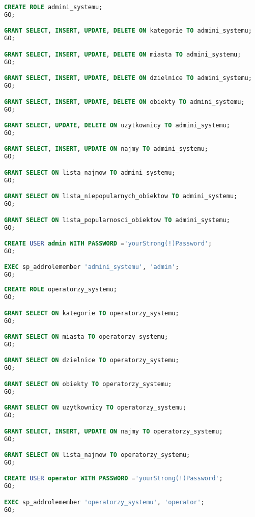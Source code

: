 \begin{lstlisting}[language=SQL, caption={Skrypt tworzący rolę i użytkownika administracyjnego}, label={lst:role-admin}]
CREATE ROLE admini_systemu;
GO;

GRANT SELECT, INSERT, UPDATE, DELETE ON kategorie TO admini_systemu;
GO;

GRANT SELECT, INSERT, UPDATE, DELETE ON miasta TO admini_systemu;
GO;

GRANT SELECT, INSERT, UPDATE, DELETE ON dzielnice TO admini_systemu;
GO;

GRANT SELECT, INSERT, UPDATE, DELETE ON obiekty TO admini_systemu;
GO;

GRANT SELECT, UPDATE, DELETE ON uzytkownicy TO admini_systemu;
GO;

GRANT SELECT, INSERT, UPDATE ON najmy TO admini_systemu;
GO;

GRANT SELECT ON lista_najmow TO admini_systemu;
GO;

GRANT SELECT ON lista_niepopularnych_obiektow TO admini_systemu;
GO;

GRANT SELECT ON lista_popularnosci_obiektow TO admini_systemu;
GO;

CREATE USER admin WITH PASSWORD ='yourStrong(!)Password';
GO;

EXEC sp_addrolemember 'admini_systemu', 'admin';
GO;
\end{lstlisting}

\begin{lstlisting}[language=SQL, caption={Skrypt tworzący rolę i użytkownika operatorskiego}, label={lst:role-operator}]
CREATE ROLE operatorzy_systemu;
GO;

GRANT SELECT ON kategorie TO operatorzy_systemu;
GO;

GRANT SELECT ON miasta TO operatorzy_systemu;
GO;

GRANT SELECT ON dzielnice TO operatorzy_systemu;
GO;

GRANT SELECT ON obiekty TO operatorzy_systemu;
GO;

GRANT SELECT ON uzytkownicy TO operatorzy_systemu;
GO;

GRANT SELECT, INSERT, UPDATE ON najmy TO operatorzy_systemu;
GO;

GRANT SELECT ON lista_najmow TO operatorzy_systemu;
GO;

CREATE USER operator WITH PASSWORD ='yourStrong(!)Password';
GO;

EXEC sp_addrolemember 'operatorzy_systemu', 'operator';
GO;
\end{lstlisting}

